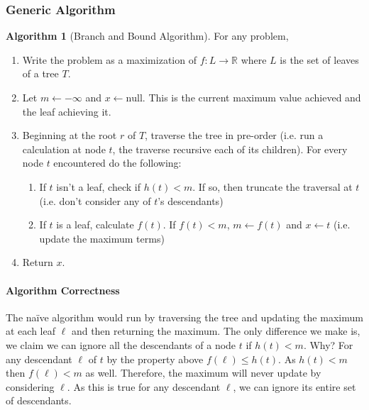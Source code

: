 \documentclass[10pt]{article}
\theoremstyle{plain}
\theoremstyle{definition}
\newtheorem{alg}[thm]{Algorithm}
\newcommand{\RR}{\mathbb{R}}
\numberwithin{equation}{section}
\numberwithin{figure}{section}
\begin{document}
\subsubsection{Generic Algorithm}
\begin{framed}
\begin{alg}[Branch and Bound Algorithm] For any problem,
\begin{enumerate}
\item Write the problem as a maximization of $f: L \rightarrow \RR$ where $L$ is the set of leaves of a tree $T$.
\item Let $m \leftarrow -\infty$ and $x \leftarrow \text{null}$. This is the current maximum value achieved and the leaf achieving it.
\item Beginning at the root $r$ of $T$, traverse the tree in pre-order (i.e. run a calculation at node $t$, the traverse recursive each of its children). For every node $t$ encountered do the following:
\begin{enumerate}
	\item If $t$ isn't a leaf, check if $h(t) < m$. If so, then truncate the traversal at $t$ (i.e. don't consider any of $t$'s descendants)
	\item If $t$ is a leaf, calculate $f(t)$. If $f(t) < m$, $m \leftarrow f(t)$ and $x \leftarrow t$ (i.e. update the maximum terms)
\end{enumerate}
\item Return $x$.
\end{enumerate}
\end{alg}
\end{framed}

\paragraph{Algorithm Correctness}
The na\"ive algorithm would run by traversing the tree and updating the maximum at each leaf $\ell$ and then returning the maximum. The only difference we make is, we claim we can ignore all the descendants of a node $t$ if $h(t) < m$. Why? For any descendant $\ell$ of $t$ by the property above $f(\ell) \leq h(t)$. As $h(t) < m$ then $f(\ell) < m$ as well. Therefore, the maximum will never update by considering $\ell$. As this is true for any descendant $\ell$, we can ignore its entire set of descendants.
\end{document}
